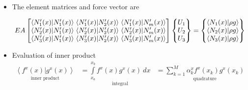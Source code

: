 \documentclass{beamer}
\begin{document}
\begin{frame}[allowframebreaks]
  \begin{itemize}
    \item The element matrices and force vector are
\begin{scriptsize}
  \begin{equation}\nonumber
    \setlength\arraycolsep{1.5pt}
    {EA}
    \begin{bmatrix}
      \left \langle N_1^\prime(x) \vert N_1^\prime(x) \right \rangle &  \left \langle N_1^\prime(x) \vert N_2^\prime(x) \right \rangle & \left \langle N_1^\prime(x) \vert N_m^\prime(x) \right \rangle \\
      \left \langle N_2^\prime(x) \vert N_1^\prime(x) \right \rangle &  \left \langle N_2^\prime(x) \vert N_2^\prime(x) \right \rangle & \left \langle N_2^\prime(x) \vert N_m^\prime(x) \right \rangle \\
      \left \langle N_3^\prime(x) \vert N_1^\prime(x) \right \rangle &  \left \langle N_3^\prime(x) \vert N_2^\prime(x) \right \rangle & \left \langle N_3^\prime(x) \vert N_m^\prime(x) \right \rangle \\
    \end{bmatrix}
    \begin{Bmatrix}
      U_1 \\
      U_2 \\
      U_3 \\
    \end{Bmatrix}=
    \begin{Bmatrix}
      \left \langle N_1(x) \vert \rho g \right \rangle \\
      \left \langle N_2(x) \vert \rho g \right \rangle \\
      \left \langle N_3(x) \vert \rho g \right \rangle \\ 
    \end{Bmatrix}    
  \end{equation}
\end{scriptsize}
\item Evaluation of  inner product
  \begin{equation}\nonumber
    \begin{aligned}
      \underset{\text{inner~product}}{\left\langle f^x(x) \big\vert g^x(x) \right\rangle} &= \underset{\text{integral}}{\int\limits_{x_a}^{x_b} f^x(x) g^x(x) ~dx} &= \underset{\text{quadrature}}{\sum_{k=1}^M \alpha_k^x f^x(x_k) g^x(x_k)}\\
    \end{aligned}
  \end{equation}  


\end{itemize}
\end{frame}
\end{document}
